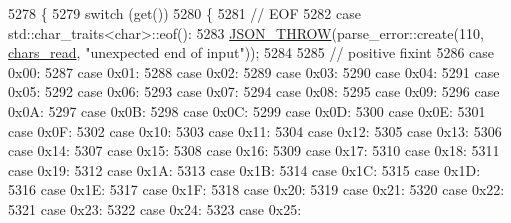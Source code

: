 \begin{DoxyCode}
5278     \{
5279         \textcolor{keywordflow}{switch} (\textcolor{keyword}{get}())
5280         \{
5281             \textcolor{comment}{// EOF}
5282             \textcolor{keywordflow}{case} std::char\_traits<char>::eof():
5283                 \hyperlink{json_8hpp_a6c274f6db2e65c1b66c7d41b06ad690f}{JSON\_THROW}(parse\_error::create(110, \hyperlink{classnlohmann_1_1detail_1_1binary__reader_a2dbde0b7390100efe0bfc54e21c3a34b}{chars\_read}, \textcolor{stringliteral}{"unexpected end of
       input"}));
5284 
5285             \textcolor{comment}{// positive fixint}
5286             \textcolor{keywordflow}{case} 0x00:
5287             \textcolor{keywordflow}{case} 0x01:
5288             \textcolor{keywordflow}{case} 0x02:
5289             \textcolor{keywordflow}{case} 0x03:
5290             \textcolor{keywordflow}{case} 0x04:
5291             \textcolor{keywordflow}{case} 0x05:
5292             \textcolor{keywordflow}{case} 0x06:
5293             \textcolor{keywordflow}{case} 0x07:
5294             \textcolor{keywordflow}{case} 0x08:
5295             \textcolor{keywordflow}{case} 0x09:
5296             \textcolor{keywordflow}{case} 0x0A:
5297             \textcolor{keywordflow}{case} 0x0B:
5298             \textcolor{keywordflow}{case} 0x0C:
5299             \textcolor{keywordflow}{case} 0x0D:
5300             \textcolor{keywordflow}{case} 0x0E:
5301             \textcolor{keywordflow}{case} 0x0F:
5302             \textcolor{keywordflow}{case} 0x10:
5303             \textcolor{keywordflow}{case} 0x11:
5304             \textcolor{keywordflow}{case} 0x12:
5305             \textcolor{keywordflow}{case} 0x13:
5306             \textcolor{keywordflow}{case} 0x14:
5307             \textcolor{keywordflow}{case} 0x15:
5308             \textcolor{keywordflow}{case} 0x16:
5309             \textcolor{keywordflow}{case} 0x17:
5310             \textcolor{keywordflow}{case} 0x18:
5311             \textcolor{keywordflow}{case} 0x19:
5312             \textcolor{keywordflow}{case} 0x1A:
5313             \textcolor{keywordflow}{case} 0x1B:
5314             \textcolor{keywordflow}{case} 0x1C:
5315             \textcolor{keywordflow}{case} 0x1D:
5316             \textcolor{keywordflow}{case} 0x1E:
5317             \textcolor{keywordflow}{case} 0x1F:
5318             \textcolor{keywordflow}{case} 0x20:
5319             \textcolor{keywordflow}{case} 0x21:
5320             \textcolor{keywordflow}{case} 0x22:
5321             \textcolor{keywordflow}{case} 0x23:
5322             \textcolor{keywordflow}{case} 0x24:
5323             \textcolor{keywordflow}{case} 0x25:

\end{DoxyCode}
